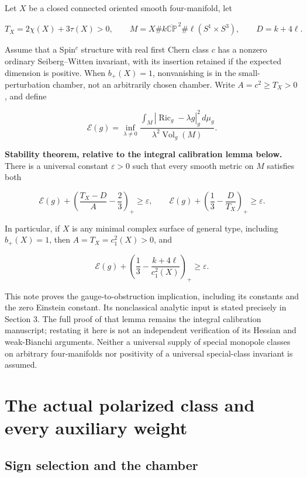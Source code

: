 \documentclass[
  10pt,
]{article}
\begin{document}
Let \(X\) be a closed connected oriented smooth four-manifold, let

\[
T_X=2\chi(X)+3\tau(X)>0,
\qquad M=X\#k\overline{\mathbb{CP}}^{\,2}
                 \#\ell(S^1\times S^3),\qquad D=k+4\ell.
\]

Assume that a Spin\(^c\) structure with real first Chern class \(c\) has
a nonzero ordinary Seiberg--Witten invariant, with its insertion
retained if the expected dimension is positive. When \(b_+(X)=1\),
nonvanishing is in the small-perturbation chamber, not an arbitrarily
chosen chamber. Write \(A=c^2\ge T_X>0\), and define

\[
\mathcal E(g)=\inf_{\lambda\ne0}
 \frac{\int_M|\operatorname{Ric}_g-\lambda g|_g^2\,d\mu_g}
 {\lambda^2\operatorname{Vol}_g(M)}.
\]

\textbf{Stability theorem, relative to the integral calibration lemma
below.} There is a universal constant \(\varepsilon>0\) such that every
smooth metric on \(M\) satisfies both

\[
\mathcal E(g)+\left(\frac{T_X-D}{A}-\frac23\right)_+
 \ge\varepsilon,
\qquad
\mathcal E(g)+\left(\frac13-\frac D{T_X}\right)_+
 \ge\varepsilon.                                      \tag{1}
\]

In particular, if \(X\) is any minimal complex surface of general type,
including \(b_+(X)=1\), then \(A=T_X=c_1^2(X)>0\), and

\[
\boxed{\mathcal E(g)+
 \left(\frac13-\frac{k+4\ell}{c_1^2(X)}\right)_+
 \ge\varepsilon.}                                    \tag{2}
\]

This note proves the gauge-to-obstruction implication, including its
constants and the zero Einstein constant. Its nonclassical analytic
input is stated precisely in Section 3. The full proof of that lemma
remains the integral calibration manuscript; restating it here is not an
independent verification of its Hessian and weak-Bianchi arguments.
Neither a universal supply of special monopole classes on arbitrary
four-manifolds nor positivity of a universal special-class invariant is
assumed.

\hypertarget{the-actual-polarized-class-and-every-auxiliary-weight}{%
\section{The actual polarized class and every auxiliary
weight}\label{the-actual-polarized-class-and-every-auxiliary-weight}}

\hypertarget{sign-selection-and-the-chamber}{%
\subsection{Sign selection and the
chamber}\label{sign-selection-and-the-chamber}}
\end{document}

